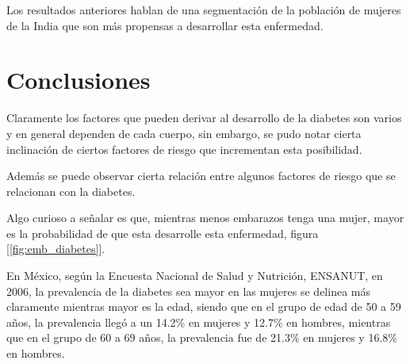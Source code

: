\documentclass{article}
\begin{document}
Los resultados anteriores hablan de una segmentación de la población de mujeres de la India que son más propensas a desarrollar esta enfermedad.

\section{Conclusiones}

Claramente los factores que pueden derivar al desarrollo de la diabetes son varios y en general dependen de cada cuerpo, sin embargo, se pudo notar cierta inclinación de ciertos factores de riesgo que incrementan esta posibilidad.

Además se puede observar cierta relación entre algunos factores de riesgo que se relacionan con la diabetes.

Algo curioso a señalar es que, mientras menos embarazos tenga una mujer, mayor es la probabilidad de que esta desarrolle esta enfermedad, figura [\ref{fig:emb_diabetes}].

En México, según la Encuesta Nacional de Salud y Nutrición, ENSANUT, en 2006, la prevalencia de la diabetes sea mayor en las mujeres se delinea más claramente mientras mayor es la edad, siendo que en el grupo de edad de 50 a 59 años, la prevalencia llegó a un 14.2\% en mujeres y 12.7\% en hombres, mientras que en el grupo de 60 a 69 años, la prevalencia fue de 21.3\% en mujeres y 16.8\% en hombres\cite{diabmx}. 




\onecolumn{
  
  
}
\end{document}
